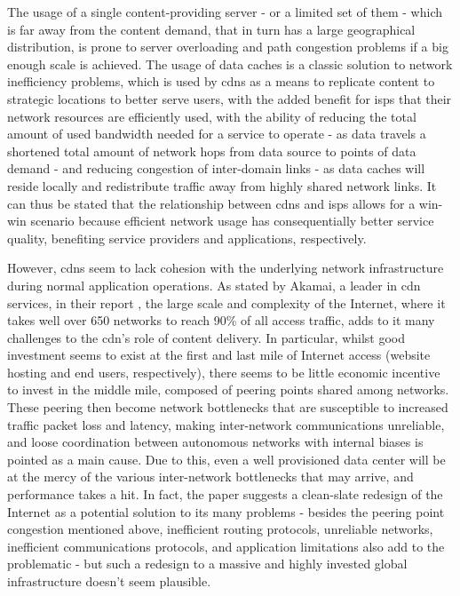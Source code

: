     The usage of a single content-providing server - or a limited set of them - which is far away from the content demand, that in turn has a large geographical distribution, is prone to server overloading and path congestion problems if a big enough scale is achieved.
    The usage of data caches is a classic solution to network inefficiency problems, which is used by \glspl{cdn} as a means to replicate content to strategic locations to better serve users, with the added benefit for \glspl{isp} that their network resources are efficiently used, with the ability of reducing the total amount of used bandwidth needed for a service to operate - as data travels a shortened total amount of network hops from data source to points of data demand - and reducing congestion of inter-domain links - as data caches will reside locally and redistribute traffic away from highly shared network links.
    It can thus be stated that the relationship between \glspl{cdn} and \glspl{isp} allows for a win-win scenario because efficient network usage has consequentially better service quality, benefiting service providers and applications, respectively.

    However, \glspl{cdn} seem to lack cohesion with the underlying network infrastructure during normal application operations.
    As stated by Akamai, a leader in \gls{cdn} services, in their report \cite{akamai-report}, the large scale and complexity of the Internet, where it takes well over 650 networks to reach 90\% of all access traffic, adds to it many challenges to the \gls{cdn}'s role of content delivery.
    In particular, whilst good investment seems to exist at the first and last mile of Internet access (website hosting and end users, respectively), there seems to be little economic incentive to invest in the middle mile, composed of peering points shared among networks.
    These peering then become network bottlenecks that are susceptible to increased traffic packet loss and latency, making inter-network communications unreliable, and loose coordination between autonomous networks with internal biases is pointed as a main cause.
    Due to this, even a well provisioned data center will be at the mercy of the various inter-network bottlenecks that may arrive, and performance takes a hit.
    In fact, the paper suggests a clean-slate redesign of the Internet as a potential solution to its many problems - besides the peering point congestion mentioned above, inefficient routing protocols, unreliable networks, inefficient communications protocols, and application limitations also add to the problematic - but such a redesign to a massive and highly invested global infrastructure doesn't seem plausible.

